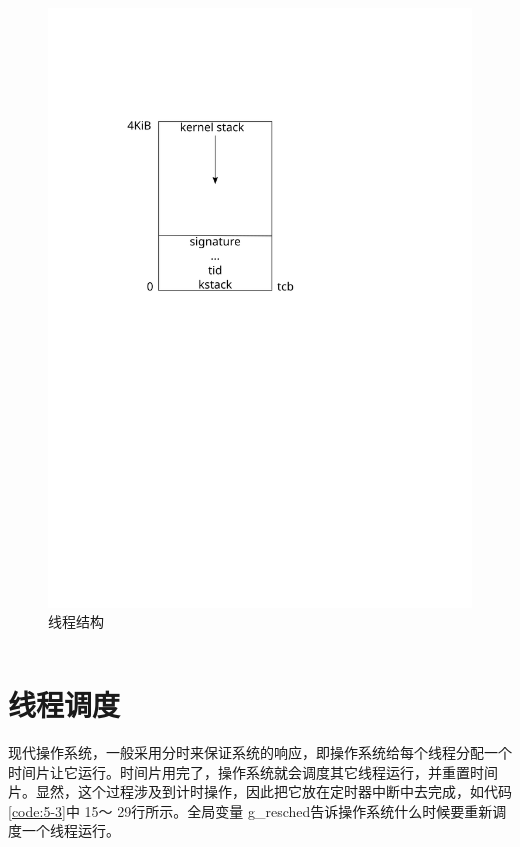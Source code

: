 \documentclass[main.tex]{subfiles}
\begin{document}
\begin{CJK*}{UTF8}{song}
\begin{figure}[htp]
\centering
\includegraphics[scale=0.4]{figures/5-1}
\caption{线程结构}
\label{figure:5-1}
\end{figure}

\begin{code}
\label{code:5-2}
\inputminted[firstline=162,lastline=202,linenos,numbersep=5pt,frame=lines,framesep=2mm]{c}{src/chapter05/kernel/task.c}
\end{code}

\section{线程调度}
现代操作系统，一般采用分时来保证系统的响应，即操作系统给每个线程分配一个时间片让它运行。时间片用完了，操作系统就会调度其它线程运行，并重置时间片。显然，这个过程涉及到计时操作，因此把它放在定时器中断中去完成，如代码\ref{code:5-3}中 15～ 29行所示。全局变量 g\_\-resched告诉操作系统什么时候要重新调度一个线程运行。


\end{CJK*}
\end{document}

